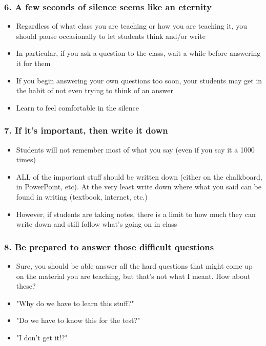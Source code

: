 \documentclass{beamer}
\begin{document}
\begin{frame}
\frametitle{6. A few seconds of silence seems like an eternity}
\begin{itemize}
	\pause
  \item Regardless of what class you are teaching or how you are teaching it, you should pause occasionally to let students think and/or write
    	\pause 
  \item In particular, if you ask a question to the class, wait a while before answering it for them
      	\pause 
  \item If you begin answering your own questions too soon, your students may get in the habit of not even trying to think of an answer
  	\pause
  \item Learn to feel comfortable in the silence
\end{itemize}
\end{frame}

\begin{frame}
\frametitle{7. If it's important, then write it down}
\begin{itemize}
	\pause 
  \item Students will not remember most of what you say (even if you say it a 1000 times)
    	\pause 
  \item \alert{ALL} of the important stuff should be written down (either on the chalkboard, in PowerPoint, etc).  At the very least write down where what you said can be found in writing (textbook, internet, etc.)
    	\pause 
  \item However, if students are taking notes, there is a limit to how much they can write down and still follow what's going on in class
\end{itemize}
\end{frame}

\begin{frame}
\frametitle{8. Be prepared to answer those difficult questions}
\begin{itemize}
	\pause 
  \item Sure, you should be able answer all the hard questions that might come up on the material you are teaching, but that's not what I meant.  How about these?
    	\pause 
  \item "Why do we have to learn this stuff?"
      	\pause 
  \item "Do we have to know this for the test?"
  	\pause
  \item "I don't get it!?"
\end{itemize}
\end{frame}
\end{document}

